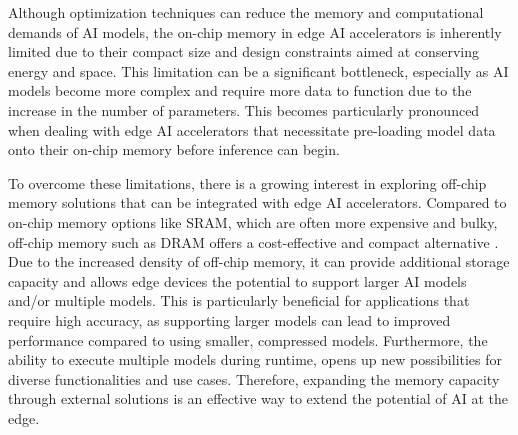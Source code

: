 Although optimization techniques can reduce the memory and computational demands of AI models, the on-chip memory in edge AI accelerators is inherently limited due to their compact size and design constraints aimed at conserving energy and space.
This limitation can be a significant bottleneck, especially as AI models become more complex and require more data to function due to the increase in the number of parameters.
This becomes particularly pronounced when dealing with edge AI accelerators that necessitate pre-loading model data onto their on-chip memory before inference can begin.

To overcome these limitations, there is a growing interest in exploring off-chip memory solutions that can be integrated with edge AI accelerators.
Compared to on-chip memory options like SRAM, which are often more expensive and bulky, off-chip memory such as DRAM offers a cost-effective and compact alternative \cite{hennessyComputerArchitectureSixth2017}.
Due to the increased density of off-chip memory, it can provide additional storage capacity and allows edge devices the potential to support larger AI models and/or multiple models.
This is particularly beneficial for applications that require high accuracy, as supporting larger models can lead to improved performance compared to using smaller, compressed models.
Furthermore, the ability to execute multiple models during runtime, opens up new possibilities for diverse functionalities and use cases.
Therefore, expanding the memory capacity through external solutions is an effective way to extend the potential of AI at the edge.
